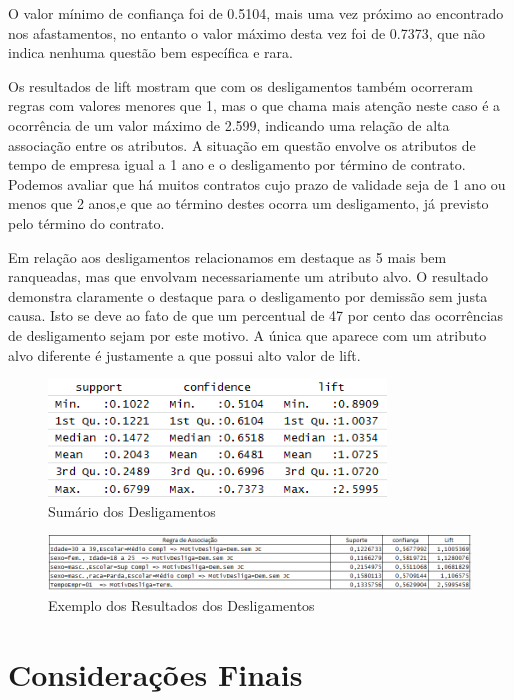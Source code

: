 \documentclass[12pt]{article}
\begin{document}
O valor mínimo de confiança foi de 0.5104, mais uma vez próximo ao encontrado nos afastamentos, no entanto o valor máximo desta vez foi de 0.7373, que não indica nenhuma questão bem específica e rara.

Os resultados de lift mostram que com os desligamentos também ocorreram regras com valores menores que 1, mas o que chama mais atenção neste caso é a ocorrência de um valor máximo de 2.599, indicando uma relação de alta associação entre os atributos.
A situação em questão envolve os atributos de tempo de empresa igual a 1 ano e o desligamento por término de contrato. Podemos avaliar que há muitos contratos cujo prazo de validade seja de 1 ano ou menos que 2 anos,e que ao término destes ocorra um desligamento, já previsto pelo término do contrato.

Em relação aos desligamentos relacionamos em destaque as 5 mais bem ranqueadas, mas que envolvam necessariamente um atributo alvo.
O resultado demonstra claramente o destaque para o desligamento por demissão sem justa causa. Isto se deve ao fato de que um percentual de 47 por cento das ocorrências de desligamento sejam por este motivo. A única que aparece com um atributo alvo diferente é justamente a que possui alto valor de lift.


\FloatBarrier
\begin{figure}[!htb]
\centering
\includegraphics[width=0.8\textwidth]{Sumary_Desligamento.png}
\caption{Sumário dos Desligamentos}
\label{fig:exampleFig8}
\end{figure}

\FloatBarrier
\begin{figure}[!htb]
\centering
\includegraphics[width=1.0\textwidth]{top5Desligamento.png}
\caption{Exemplo dos Resultados dos Desligamentos}
\label{fig:exampleFig9}
\end{figure}


\section{Considerações Finais}
\end{document}
